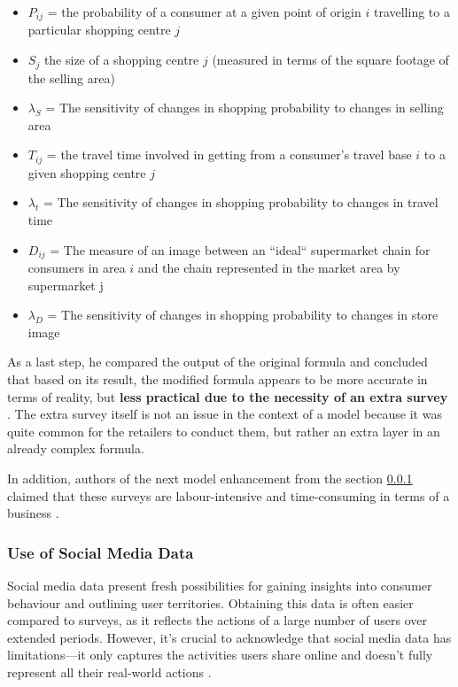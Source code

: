 \begin{itemize}
    \item{$P_{ij}$ = the probability of a consumer at a given point of origin $i$ travelling to a particular shopping centre $j$}
    \item{$S_j$ the size of a shopping centre $j$ (measured in terms of the square footage of the selling area)}
    \item{$\lambda_S$ = The sensitivity of changes in shopping probability to changes in selling area}
    \item{$T_{ij}$ = the travel time involved in getting from a consumer's travel base $i$ to a given shopping centre $j$}
    \item{$\lambda_t$ = The sensitivity of changes in shopping probability to changes in travel time}
    \item{$D_{ij}$ = The measure of an image between an ``ideal`` supermarket chain for consumers in area $i$ and the chain represented in the market area by supermarket j}
    \item{$\lambda_D$ = The sensitivity of changes in shopping probability to changes in store image}
\end{itemize}

As a last step, he compared the output of the original formula and concluded that based on its result, the modified formula appears to be more accurate in terms of reality, but \textbf{less practical due to the necessity of an extra survey} \cite{stanley1976image}. The extra survey itself is not an issue in the context of a model because it was quite common for the retailers to conduct them, but rather an extra layer in an already complex formula. 

In addition, authors of the next model enhancement from the section \ref{label:huff-with-social-media} claimed that these surveys are labour-intensive and time-consuming in terms of a business \cite{wang2016evaluating}.

\subsubsection{Use of Social Media Data}
\label{label:huff-with-social-media}

Social media data present fresh possibilities for gaining insights into consumer behaviour and outlining user territories. Obtaining this data is often easier compared to surveys, as it reflects the actions of a large number of users over extended periods. However, it's crucial to acknowledge that social media data has limitations---it only captures the activities users share online and doesn't fully represent all their real-world actions \cite{wang2016evaluating}.


